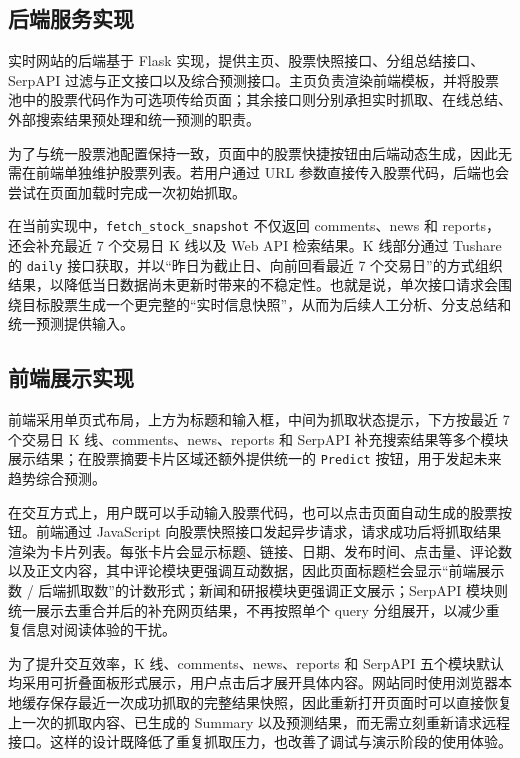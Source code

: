 \subsection{后端服务实现}

实时网站的后端基于 Flask 实现，提供主页、股票快照接口、分组总结接口、SerpAPI 过滤与正文接口以及综合预测接口。主页负责渲染前端模板，并将股票池中的股票代码作为可选项传给页面；其余接口则分别承担实时抓取、在线总结、外部搜索结果预处理和统一预测的职责。

为了与统一股票池配置保持一致，页面中的股票快捷按钮由后端动态生成，因此无需在前端单独维护股票列表。若用户通过 URL 参数直接传入股票代码，后端也会尝试在页面加载时完成一次初始抓取。

在当前实现中，\texttt{fetch\_stock\_snapshot} 不仅返回 comments、news 和 reports，还会补充最近 7 个交易日 K 线以及 Web API 检索结果。K 线部分通过 Tushare 的 \texttt{daily} 接口获取，并以“昨日为截止日、向前回看最近 7 个交易日”的方式组织结果，以降低当日数据尚未更新时带来的不稳定性。也就是说，单次接口请求会围绕目标股票生成一个更完整的“实时信息快照”，从而为后续人工分析、分支总结和统一预测提供输入。

\subsection{前端展示实现}

前端采用单页式布局，上方为标题和输入框，中间为抓取状态提示，下方按最近 7 个交易日 K 线、comments、news、reports 和 SerpAPI 补充搜索结果等多个模块展示结果；在股票摘要卡片区域还额外提供统一的 \texttt{Predict} 按钮，用于发起未来趋势综合预测。

在交互方式上，用户既可以手动输入股票代码，也可以点击页面自动生成的股票按钮。前端通过 JavaScript 向股票快照接口发起异步请求，请求成功后将抓取结果渲染为卡片列表。每张卡片会显示标题、链接、日期、发布时间、点击量、评论数以及正文内容，其中评论模块更强调互动数据，因此页面标题栏会显示“前端展示数 / 后端抓取数”的计数形式；新闻和研报模块更强调正文展示；SerpAPI 模块则统一展示去重合并后的补充网页结果，不再按照单个 query 分组展开，以减少重复信息对阅读体验的干扰。

为了提升交互效率，K 线、comments、news、reports 和 SerpAPI 五个模块默认均采用可折叠面板形式展示，用户点击后才展开具体内容。网站同时使用浏览器本地缓存保存最近一次成功抓取的完整结果快照，因此重新打开页面时可以直接恢复上一次的抓取内容、已生成的 Summary 以及预测结果，而无需立刻重新请求远程接口。这样的设计既降低了重复抓取压力，也改善了调试与演示阶段的使用体验。

